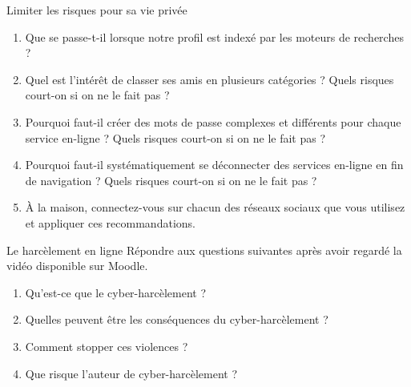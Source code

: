 \documentclass[a4paper, dvipsnames]{article}
\begin{document}
\begin{activite}[breakable]{Limiter les risques pour sa vie privée}{}
  \bigskip

  \begin{enumerate}
    \item Que se passe-t-il lorsque notre profil est indexé par les moteurs de recherches ? 
    \item Quel est l'intérêt de classer ses amis en plusieurs catégories ? Quels risques court-on si on ne le fait pas ?
    \item Pourquoi faut-il créer des mots de passe complexes et différents pour chaque service en-ligne ? Quels risques court-on si on ne le fait pas ?
    \item Pourquoi faut-il systématiquement se déconnecter des services en-ligne en fin de navigation ? Quels risques court-on si on ne le fait pas ?
    \item À la maison, connectez-vous sur chacun des réseaux sociaux que vous utilisez et appliquer ces recommandations. 
  \end{enumerate}
\end{activite}

\bigskip

\begin{activite}{Le harcèlement en ligne}{}
  Répondre aux questions suivantes après avoir regardé la vidéo disponible sur Moodle.

  \begin{enumerate}
    \item Qu'est-ce que le cyber-harcèlement ?
    \item Quelles peuvent être les conséquences du cyber-harcèlement ?
    \item Comment stopper ces violences ?
    \item Que risque l'auteur de cyber-harcèlement ?
  \end{enumerate}
\end{activite}
\end{document}

